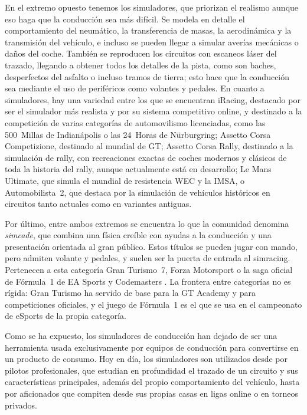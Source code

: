 En el extremo opuesto tenemos los simuladores, que priorizan el realismo aunque eso haga que la conducción sea más difícil. Se modela en detalle el comportamiento del neumático, la transferencia de masas, la aerodinámica y la transmisión del vehículo, e incluso se pueden llegar a simular averías mecánicas o daños del coche. También se reproducen los circuitos con escaneos láser del trazado, llegando a obtener todos los detalles de la pista, como son baches, desperfectos del asfalto o incluso tramos de tierra; esto hace que la conducción sea mediante el uso de periféricos como volantes y pedales. En cuanto a simuladores, hay una variedad entre los que se encuentran iRacing, destacado por ser el simulador más realista y por su sistema competitivo online, y destinado a la competición de varias categorías de automovilismo licenciadas, como las 500~Millas de Indianápolis o las 24~Horas de Nürburgring; Assetto Corsa Competizione, destinado al mundial de GT; Assetto Corsa Rally, destinado a la simulación de rally, con recreaciones exactas de coches modernos y clásicos de toda la historia del rally, aunque actualmente está en desarrollo; Le Mans Ultimate, que simula el mundial de resistencia WEC y la IMSA, o Automobilista~2, que destaca por la simulación de vehículos históricos en circuitos tanto actuales como en variantes antiguas.


Por último, entre ambos extremos se encuentra lo que la comunidad denomina \textit{simcade}, que combina una física creíble con ayudas a la conducción y una presentación orientada al gran público. Estos títulos se pueden jugar con mando, pero admiten volante y pedales, y suelen ser la puerta de entrada al simracing. Pertenecen a esta categoría Gran Turismo~7, Forza Motorsport o la saga oficial de Fórmula~1 de EA Sports y Codemasters \parencite{ruscio_2017_racing_realism, kececi_2026_simracing_realism}. La frontera entre categorías no es rígida: Gran Turismo ha servido de base para la GT Academy y para competiciones oficiales, y el juego de Fórmula~1 es el que se usa en el campeonato de eSports de la propia categoría.

Como se ha expuesto, los simuladores de conducción han dejado de ser una herramienta usada exclusivamente por equipos de conducción para convertirse en un producto de consumo. Hoy en día, los simuladores son utilizados desde por pilotos profesionales, que estudian en profundidad el trazado de un circuito y sus características principales, además del propio comportamiento del vehículo, hasta por aficionados que compiten desde sus propias casas en ligas online o en torneos privados.

